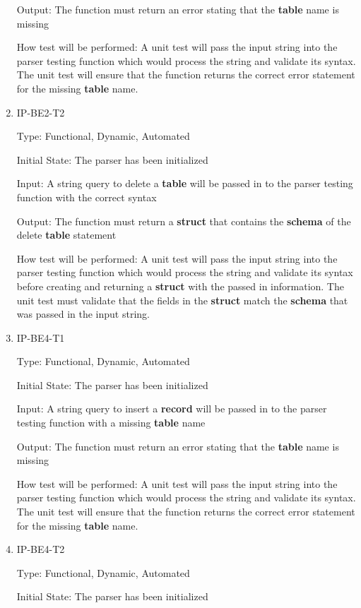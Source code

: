 \documentclass[12pt, titlepage]{article}
\begin{document}
\begin{enumerate}
Output: The function must return an error stating that the \textbf{table} name is missing
					
How test will be performed: A unit test will pass the input string into the parser testing function which would process the string and validate its syntax. The unit test will ensure that the function returns the correct error statement for the missing \textbf{table} name.

\item{IP-BE2-T2}

Type: Functional, Dynamic, Automated
					
Initial State: The parser has been initialized
					
Input: A string query to delete a \textbf{table} will be passed in to the parser testing function with the correct syntax
					
Output: The function must return a \textbf{struct} that contains the \textbf{schema} of the delete \textbf{table} statement
					
How test will be performed: A unit test will pass the input string into the parser testing function which would process the string and validate its syntax before creating and returning a \textbf{struct} with the passed in information. The unit test must validate that the fields in the \textbf{struct} match the \textbf{schema} that was passed in the input string.

\item{IP-BE4-T1}

Type: Functional, Dynamic, Automated
					
Initial State: The parser has been initialized
					
Input: A string query to insert a \textbf{record} will be passed in to the parser testing function with a missing \textbf{table} name
					
Output: The function must return an error stating that the \textbf{table} name is missing
					
How test will be performed: A unit test will pass the input string into the parser testing function which would process the string and validate its syntax. The unit test will ensure that the function returns the correct error statement for the missing \textbf{table} name.

\item{IP-BE4-T2}

Type: Functional, Dynamic, Automated
					
Initial State: The parser has been initialized
					

\end{enumerate}
\end{document}
